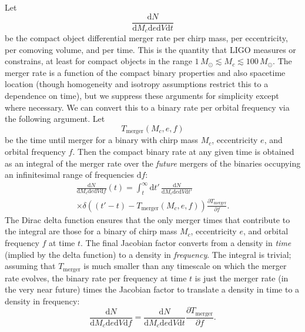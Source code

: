 \documentclass[twocolumn]{aastex631}
\newcommand{\dd}{\mathrm{d}}
\newcommand{\diff}[2]{\frac{\dd #1}{\dd #2}}
\newcommand{\MSun}{M_\odot}
\begin{document}
Let 
\begin{equation}
    \diff{N}{M_c \dd e \dd V \dd t} 
\end{equation}
be the compact object differential merger rate per chirp mass, per eccentricity,
per comoving volume, and per time.  This is the quantity that LIGO measures or
constrains, at least for compact objects in the range $1 \, \MSun \lesssim M_c
\lesssim 100 \, \MSun$.  The merger rate is a function of the compact binary
properties and also spacetime location (though homogeneity and isotropy
assumptions restrict this to a dependence on time), but we suppress these
arguments for simplicity except where necessary.  We can convert this to a
binary rate per orbital frequency via the following argument.  Let 
\begin{equation}
    T_\mathrm{merger}\left( M_c, e, f \right)
\end{equation}
be the time until merger for a binary with chirp mass $M_c$, eccentricity $e$,
and orbital frequency $f$.  Then the compact binary rate at any given time is
obtained as an integral of the merger rate over the \emph{future} mergers of the
binaries occupying an infinitesimal range of frequencies $\dd f$:
\begin{multline}
    \diff{N}{M_c \dd e \dd V \dd f}\left( t \right) = \int_{t}^{\infty} \dd t' \, \diff{N}{M_c \dd e \dd V \dd t'} \\ \times \delta\left( \left( t' - t \right) - T_\mathrm{merger}\left( M_c, e, f \right) \right) \frac{\partial T_\mathrm{merger}}{\partial f}.
\end{multline}
The Dirac delta function ensures that the only merger times that contribute to
the integral are those for a binary of chirp mass $M_c$, eccentricity $e$, and
orbital frequency $f$ at time $t$.  The final Jacobian factor converts from a
density in \emph{time} (implied by the delta function) to a density in
\emph{frequency}.  The integral is trivial; assuming that $T_\mathrm{merger}$ is
much smaller than any timescale on which the merger rate evolves, the binary
rate per frequency at time $t$ is just the merger rate (in the very near future)
times the Jacobian factor to translate a density in time to a density in
frequency:
\begin{equation}
    \label{eq:mergers-per-frequency}
    \diff{N}{M_c \dd e \dd V \dd f} = \diff{N}{M_c \dd e \dd V \dd t} \frac{\partial T_\mathrm{merger}}{\partial f}.
\end{equation}
\end{document}
